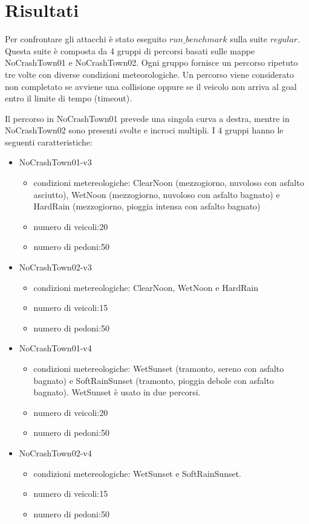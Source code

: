 \section{Risultati}
Per confrontare gli attacchi è stato eseguito $run\_benchmark$ sulla suite $regular$.
Questa suite è composta da 4 gruppi di percorsi basati sulle mappe NoCrashTown01 e NoCrashTown02. Ogni gruppo fornisce un percorso ripetuto tre volte con diverse condizioni meteorologiche.
Un percorso viene considerato non completato se avviene una collisione oppure se il veicolo non arriva al goal entro il limite di tempo (timeout).

Il percorso in NoCrashTown01 prevede una singola curva a destra, mentre in NoCrashTown02 sono presenti svolte e incroci multipli.
I 4 gruppi hanno le seguenti caratteristiche:\begin{itemize}
    \item NoCrashTown01-v3\begin{itemize}
        \item condizioni metereologiche: ClearNoon (mezzogiorno, nuvoloso con asfalto asciutto), WetNoon (mezzogiorno, nuvoloso con asfalto bagnato) e HardRain (mezzogiorno, pioggia intensa con asfalto bagnato)
        \item numero di veicoli:20
        \item numero di pedoni:50
    \end{itemize}
    \item NoCrashTown02-v3 \begin{itemize}
        \item condizioni metereologiche: ClearNoon, WetNoon e HardRain 
        \item numero di veicoli:15
        \item numero di pedoni:50
    \end{itemize}
    \item NoCrashTown01-v4 \begin{itemize}
        \item condizioni metereologiche: WetSunset (tramonto, sereno con asfalto bagnato) e SoftRainSunset (tramonto, pioggia debole  con asfalto bagnato). WetSunset è usato in due percorsi.
        \item numero di veicoli:20
        \item numero di pedoni:50
    \end{itemize}
    \item NoCrashTown02-v4 \begin{itemize}
        \item condizioni metereologiche: WetSunset  e SoftRainSunset.
        \item numero di veicoli:15
        \item numero di pedoni:50
    \end{itemize}
\end{itemize}

